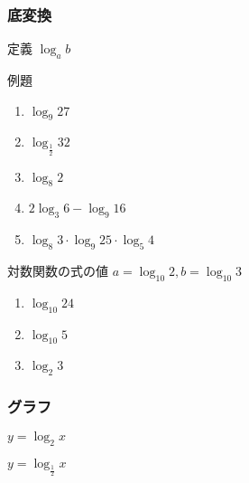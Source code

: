 \documentclass[10pt,dvipdfmx]{jsarticle}
\begin{document}
\subsubsection*{底変換}
定義 $\log_{a}b$
\vspace{8mm}
\begin{itembox}[l]{例題}
  \begin{multicols}{3}
    \begin{large}
      \begin{enumerate}
        \item $\log_{9}27$
        \item $\log_{\frac{1}{2}}32$
        \item $\log_{8}2$
        \item $2\log_{3}6-\log_{9}16$
        \item $\log_{8}3\cdot\log_{9}25\cdot\log_{5}4$
      \end{enumerate}
    \end{large}
  \end{multicols}
\end{itembox}

\begin{itembox}[l]{対数関数の式の値}
  $a=\log_{10}2, b=\log_{10}3$
  \begin{multicols}{3}
    \begin{large}
      \begin{enumerate}
        \item $\log_{10}24$
        \item $\log_{10}5$
        \item $\log_{2}3$
      \end{enumerate}
    \end{large}
  \end{multicols}
\end{itembox}

\subsubsection*{グラフ}

\begin{table}[H]
  \begin{minipage}{0.5\linewidth}
    $y=\log_{2}x$
    \begin{center}
    \end{center}
  \end{minipage}
  \begin{minipage}{0.5\linewidth}
    $y=\log_{\frac{1}{2}}x$
    \begin{center}
    \end{center}
  \end{minipage}
\end{table}
\end{document}
